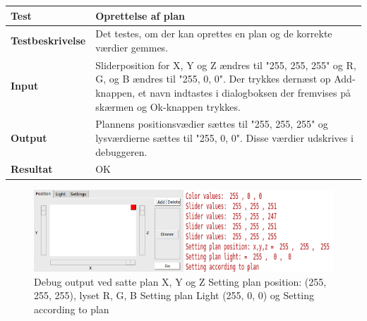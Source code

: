 \begin{table}[H]
\begin{tabular}{|l|l|}\hline
\textbf{Test} & Oprettelse af plan \\\hline

\textbf{Testbeskrivelse} & \multicolumn{1}{|m{11.5cm}|}{Det testes, om der kan oprettes en plan og de korrekte værdier gemmes.} \\\hline

\textbf{Input} & \multicolumn{1}{|m{11.5cm}|}{Sliderposition for X, Y og Z ændres til "255, 255, 255" og R, G, og B ændres til "255, 0, 0". Der trykkes dernæst op Add-knappen, et navn indtastes i dialogboksen der fremvises på skærmen og Ok-knappen trykkes.} \\\hline

\textbf{Output} & \multicolumn{1}{|m{11.5cm}|}{Plannens positionsvædier sættes til "255, 255, 255" og lysværdierne sættes til "255, 0, 0". Disse værdier udskrives i debuggeren.} \\\hline

\textbf{Resultat} & \multicolumn{1}{|m{11.5cm}|}{ OK} \\\hline

\end{tabular}
\end{table}

\begin{figure}[H]
\centering
\includegraphics[width=1.0\linewidth]{0_Filer/Figuer/testMakePlan.png}
\caption{Debug output ved satte plan X, Y og Z Setting plan position: (255, 255, 255), lyset R, G, B Setting plan Light (255, 0, 0) og Setting according to plan}
\label{fig:testmakePlan}
\end{figure}
